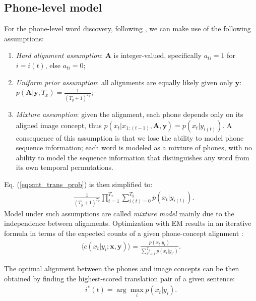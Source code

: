 \documentclass[journal]{IEEEtran}
\begin{document}
\subsection{Phone-level model}
 For the phone-level word discovery, following \cite{Brown92}, we can make use of the following assumptions:
\begin{enumerate}
    \item \textit{Hard alignment assumption}: $\mathbf{A}$ is integer-valued, specifically $a_{ti}=1$ for $i=i(t)$, else $a_{ti}=0$;
    \item \textit{Uniform prior assumption}: all alignments are equally likely given only $\mathbf{y}$: $p(\mathbf A|\mathbf y, T_x) = \frac{1}{(T_y+1)^{T_x}}$;
    \item \textit{Mixture assumption}: given the alignment,
each phone depends only on its aligned image concept, thus
$p(x_t|x_{1:(t-1)},\mathbf{A},\mathbf{y})=p(x_t|y_{i(t)})$. A consequence of this assumption is that we lose the ability to model phone sequence information; each word is modeled as a mixture of phones, with no ability to model the sequence information that distinguishes any word from its own temporal permutations.
\end{enumerate}
Eq. (\ref{eq:smt_trans_prob}) is then simplified to:
\begin{align}
    &\frac{1}{(T_y+1)^{T_x}}\prod_{t=1}^{T_x}\sum_{i(t)=0}^{T_y} p(x_t|y_{i(t)}).
\end{align}
Model under such assumptions are called \textit{mixture model} mainly due to the independence between alignments. Optimization with EM results in 
an iterative formula
in terms of the expected counts of a given phone-concept alignment \cite{Brown93}:
\begin{align}
\label{eq:expected_count_ibm1}
    \langle c(x_t|y_i;\mathbf x, \mathbf y)\rangle = \frac{p(x_t|y_i)}{\sum_{i'=1}^{T_y}p(x_t|y_{i'})}.
\end{align}

The optimal alignment between the phones and image concepts can be then obtained by finding the highest-scored translation pair of a given sentence:
\begin{align}\label{eq:smt_alignment}
    i^*(t) = \arg\max_i p(x_t|y_i).
\end{align}
\end{document}
